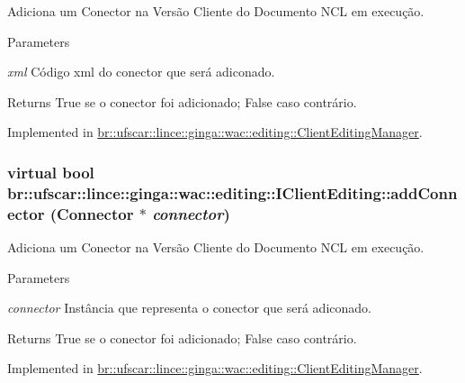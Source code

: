 Adiciona um Conector na Versão Cliente do Documento NCL em execução. 


\begin{DoxyParams}{Parameters}
\item[{\em xml}]Código xml do conector que será adiconado. \end{DoxyParams}
\begin{DoxyReturn}{Returns}
True se o conector foi adicionado; False caso contrário. 
\end{DoxyReturn}


Implemented in \hyperlink{classbr_1_1ufscar_1_1lince_1_1ginga_1_1wac_1_1editing_1_1ClientEditingManager_a62f5c2e221cba63f7a47c3a8ce1d154f}{br::ufscar::lince::ginga::wac::editing::ClientEditingManager}.

\hypertarget{classbr_1_1ufscar_1_1lince_1_1ginga_1_1wac_1_1editing_1_1IClientEditing_ac3ce7f9f55bc61cb7166b741a73e77d9}{
\subsubsection[{addConnector}]{\setlength{\rightskip}{0pt plus 5cm}virtual bool br::ufscar::lince::ginga::wac::editing::IClientEditing::addConnector (Connector $\ast$ {\em connector})}}
\label{classbr_1_1ufscar_1_1lince_1_1ginga_1_1wac_1_1editing_1_1IClientEditing_ac3ce7f9f55bc61cb7166b741a73e77d9}


Adiciona um Conector na Versão Cliente do Documento NCL em execução. 


\begin{DoxyParams}{Parameters}
\item[{\em connector}]Instância que representa o conector que será adiconado. \end{DoxyParams}
\begin{DoxyReturn}{Returns}
True se o conector foi adicionado; False caso contrário. 
\end{DoxyReturn}


Implemented in \hyperlink{classbr_1_1ufscar_1_1lince_1_1ginga_1_1wac_1_1editing_1_1ClientEditingManager_afbc2f133a39eff4008bba3817f8c76a1}{br::ufscar::lince::ginga::wac::editing::ClientEditingManager}.

